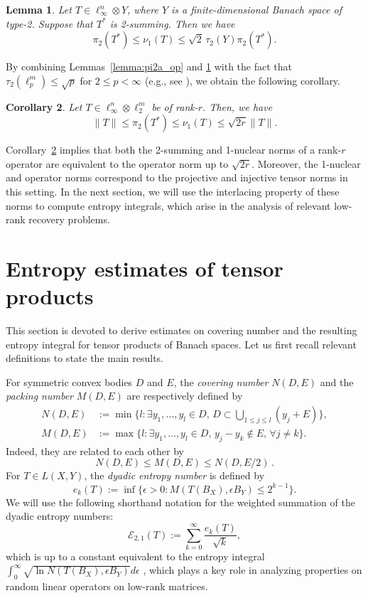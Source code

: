 \documentclass[11pt]{article}
\newtheorem{lemma}{Lemma}[section]
\newtheorem{cor}[lemma]{Corollary}
\newcommand{\red}{\color{red}}
\newcommand{\nbr}[1]{{\sf\red[#1]}}
\begin{document}
\begin{lemma}
\label{lemma:pi2a_nu1}
Let $T \in \ell_\infty^n \otimes Y$, where $Y$ is a finite-dimensional Banach space of type-2. 
Suppose that $T^*$ is 2-summing. 
Then we have
\[
\pi_2(T^*) \leq \nu_1(T) \leq \sqrt{2} \, \tau_2(Y) \pi_2(T^*).
\]
\end{lemma}


By combining Lemmas~\ref{lemma:pi2a_op} and \ref{lemma:pi2a_nu1} with the fact that $\tau_2(\ell_p^m) \leq \sqrt{p}$ for $2 \leq p < \infty$ (e.g., see \cite[Lemma~3]{carl1985inequalities}), we obtain the following corollary.

\begin{cor}
\label{cor:injproj_inftype2}
Let $T \in \ell_\infty^n \otimes \ell_2^m$ be of rank-$r$. 
Then, we have
\[
\|T\| \leq \pi_2(T^*) \leq \nu_1(T) \leq \sqrt{2r} \|T\|.
\]
\end{cor}

\noindent Corollary~\ref{cor:injproj_inftype2} implies that both the 2-summing and 1-nuclear norms of a rank-$r$ operator are equivalent to the operator norm up to $\sqrt{2r}$. 
Moreover, the 1-nuclear and operator norms correspond to the projective and injective tensor norms in this setting. 
In the next section, we will use the interlacing property of these norms to compute entropy integrals, which arise in the analysis of relevant low-rank recovery problems. 


\section{Entropy estimates of tensor products}
\label{sec:ent_est}

This section is devoted to derive estimates on covering number and the resulting entropy integral for tensor products of Banach spaces. 
Let us first recall relevant definitions to state the main results. 

For symmetric convex bodies $D$ and $E$, the \emph{covering number} $N(D,E)$ and the \emph{packing number} $M(D,E)$ are respectively defined by
\begin{align*}
N(D,E) & := \min \Big\{ l : \exists y_1,\dots,y_l \in D, \, D \subset \bigcup_{1\le j \le l} (y_j + E) \Big\}, \\
M(D,E) & := \max \Big\{ l : \exists y_1,\dots,y_l \in D, \, y_j-y_k \not\in E, \, \forall j\neq k \Big\}.
\end{align*}
Indeed, they are related to each other by
\[
N(D,E) \leq M(D,E) \leq N(D,E/2) \, .
\]
For $T \in L(X,Y)$, the \emph{dyadic entropy number} \citep{carl1990entropy} is defined by
\[
e_k(T) := \inf\{\epsilon > 0 : M(T(B_X),\epsilon B_Y)\leq 2^{k-1}\}.
\]
We will use the following shorthand notation for the weighted summation of the dyadic entropy numbers:
\[
\mathcal{E}_{2,1}(T) := \sum_{k=0}^\infty \frac{e_k(T)}{\sqrt{k}},
\]
which is up to a constant equivalent to the entropy integral $\int_0^{\infty} \sqrt{\ln N(T(B_X),\epsilon B_Y)} d\epsilon$ \citep{pisier1999volume}, which plays a key role in analyzing properties on random linear operators on low-rank matrices.
\end{document}
